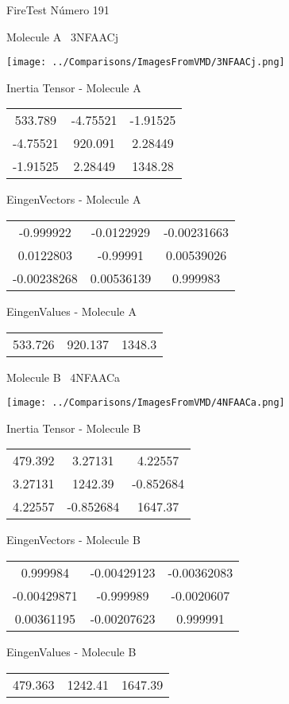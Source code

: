 \vtab[-3cm]
\begin{center}
{\large FireTest \tab Número 191}
\end{center}
\begin{multicols}{2}
\begin{center}

Molecule A \
3NFAACj

\texttt{[image: ../Comparisons/ImagesFromVMD/3NFAACj.png]}

Inertia Tensor - Molecule A \\
\begin{tabular}{|c c c|}
533.789	 & 	-4.75521	 & 	-1.91525	 \\
-4.75521	 & 	920.091	 & 	2.28449	 \\
-1.91525	 & 	2.28449	 & 	1348.28
\end{tabular}

\vtab
 EingenVectors - Molecule A     \\
\begin{tabular}{|c c c|}
-0.999922	 & 	-0.0122929	 & 	-0.00231663	 \\
0.0122803	 & 	-0.99991	 & 	0.00539026	 \\
-0.00238268	 & 	0.00536139	 & 	0.999983
\end{tabular}

\vtab
 EingenValues - Molecule A     \\
\begin{tabular}{|c c c|}
533.726	 & 	920.137	 & 	1348.3	 \\
\end{tabular}
\columnbreak

Molecule B \
4NFAACa

\texttt{[image: ../Comparisons/ImagesFromVMD/4NFAACa.png]}

Inertia Tensor - Molecule B \\
\begin{tabular}{|c c c|}
479.392	 & 	3.27131	 & 	4.22557	 \\
3.27131	 & 	1242.39	 & 	-0.852684	 \\
4.22557	 & 	-0.852684	 & 	1647.37
\end{tabular}

\vtab
 EingenVectors - Molecule B     \\
\begin{tabular}{|c c c|}
0.999984	 & 	-0.00429123	 & 	-0.00362083	 \\
-0.00429871	 & 	-0.999989	 & 	-0.0020607	 \\
0.00361195	 & 	-0.00207623	 & 	0.999991
\end{tabular}

\vtab
 EingenValues - Molecule B     \\
\begin{tabular}{|c c c|}
479.363	 & 	1242.41	 & 	1647.39	 \\
\end{tabular}

\end{center}
\end{multicols}

